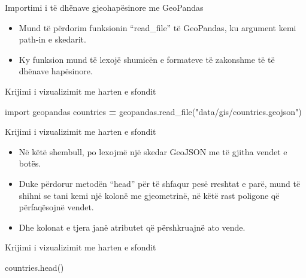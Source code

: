 \documentclass[
  ignorenonframetext,
]{beamer}
\newenvironment{Shaded}{\begin{snugshade}}{\end{snugshade}}
\newcommand{\ImportTok}[1]{#1}
\newcommand{\NormalTok}[1]{#1}
\newcommand{\OperatorTok}[1]{\textcolor[rgb]{0.81,0.36,0.00}{\textbf{#1}}}
\newcommand{\StringTok}[1]{\textcolor[rgb]{0.31,0.60,0.02}{#1}}
\begin{document}
\begin{frame}{Importimi i të dhënave gjeohapësinore me GeoPandas}
\protect\hypertarget{importimi-i-tuxeb-dhuxebnave-gjeohapuxebsinore-me-geopandas-1}{}
\begin{itemize}
\item
  Mund të përdorim funksionin ``read\_file'' të GeoPandas, ku argument
  kemi path-in e skedarit.
\item
  Ky funksion mund të lexojë shumicën e formateve të zakonshme të të
  dhënave hapësinore.
\end{itemize}
\end{frame}

\begin{frame}[fragile]{Krijimi i vizualizimit me harten e sfondit}
\protect\hypertarget{krijimi-i-vizualizimit-me-harten-e-sfondit-1}{}

\begin{Shaded}
\begin{Highlighting}[]
\ImportTok{import}\NormalTok{ geopandas}
\NormalTok{countries }\OperatorTok{=}\NormalTok{ geopandas.read\_file(}\StringTok{"data/gis/countries.geojson"}\NormalTok{)}
\end{Highlighting}
\end{Shaded}
\end{frame}

\begin{frame}{Krijimi i vizualizimit me harten e sfondit}
\protect\hypertarget{krijimi-i-vizualizimit-me-harten-e-sfondit-2}{}
\begin{itemize}
\item
  Në këtë shembull, po lexojmë një skedar GeoJSON me të gjitha vendet e
  botës.
\item
  Duke përdorur metodën ``head'' për të shfaqur pesë rreshtat e parë,
  mund të shihni se tani kemi një kolonë me gjeometrinë, në këtë rast
  poligone që përfaqësojnë vendet.
\item
  Dhe kolonat e tjera janë atributet që përshkruajnë ato vende.
\end{itemize}
\end{frame}

\begin{frame}[fragile]{Krijimi i vizualizimit me harten e sfondit}
\protect\hypertarget{krijimi-i-vizualizimit-me-harten-e-sfondit-3}{}

\begin{Shaded}
\begin{Highlighting}[]
\NormalTok{countries.head()}
\end{Highlighting}
\end{Shaded}
\end{frame}
\end{document}
